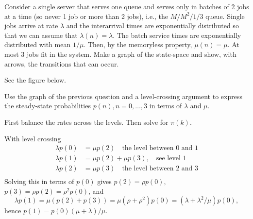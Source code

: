 \begin{exercise}
  Consider a single server that serves one queue and serves only in
  batches of 2 jobs at a time (so never 1 job or more than 2 jobs),
  i.e., the $M/M^2/1/3$ queue.  Single jobs arrive at rate $\lambda$
  and the interarrival times are exponentially distributed so that we can assume that $\lambda(n) = \lambda$. The batch service times are exponentially distributed with mean $1/\mu$. Then, by the memoryless property, $\mu(n) = \mu$. At most 3 jobs fit in the system.   Make a graph of the state-space and show, with arrows, the
  transitions that can occur.

  \begin{solution}
See the figure below.

  \end{solution}
\end{exercise}

\begin{exercise}
  Use the graph of the previous question and a level-crossing argument
  to express the steady-state probabilities $p(n),n=0,\ldots, 3$ in
  terms of $\lambda$ and $\mu$.
  \begin{hint}
First balance the rates across the levels. Then solve for $\pi(k)$.
  \end{hint}
  \begin{solution}
With level crossing
  \begin{align*}
    \lambda p(0)  &= \mu p(2) \quad\text{the level between 0 and 1}\\
    \lambda p(1)  &= \mu p(2) +\mu p(3), \quad\text{see level 1}\\
    \lambda p(2)  &= \mu p(3)\quad\text{the level between 2 and 3}\\
  \end{align*}
  Solving this in terms of $p(0)$ gives $p(2) = \rho p(0)$, $p(3) = \rho p(2) = \rho^2p(0)$, and
  \begin{equation*}
    \lambda p(1) = \mu(p(2) + p(3)) = \mu (\rho + \rho^2) p(0) = (\lambda + \lambda^2/\mu) p(0),
  \end{equation*}
hence $p(1) = p(0)(\mu + \lambda)/\mu$. 
  \end{solution}
\end{exercise}



